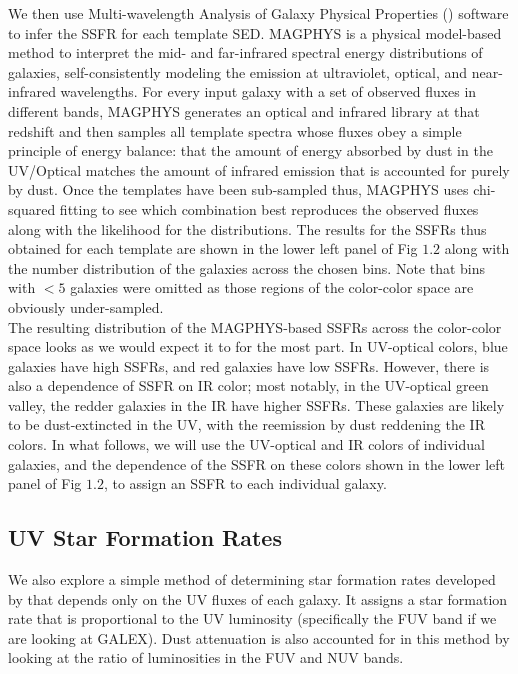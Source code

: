 We then use Multi-wavelength Analysis of Galaxy Physical Properties 
(\citet{da_cunha_simple_2008}) software to infer the SSFR for 
each template SED. MAGPHYS is a physical model-based method
to interpret the mid- and far-infrared spectral energy distributions 
of galaxies, self-consistently modeling the emission at ultraviolet, 
optical, and near-infrared wavelengths. For every input galaxy 
with a set of observed fluxes in different bands, MAGPHYS generates 
an optical and infrared library at that redshift and then 
samples all template spectra whose fluxes obey a simple principle 
of energy balance: that the amount of energy absorbed by dust 
in the UV/Optical matches the amount of infrared emission that 
is accounted for purely by dust. Once the templates have been 
sub-sampled thus, MAGPHYS uses chi-squared fitting to see which 
combination best reproduces the observed fluxes along with the 
likelihood for the distributions. The results for the SSFRs 
thus obtained for each template are shown in the lower left 
panel of Fig $1.2$ along with the number distribution of 
the galaxies across the chosen bins. Note that bins with 
$< 5$ galaxies were omitted as those regions of the 
color-color space are obviously under-sampled.\\ 

The resulting distribution of the MAGPHYS-based SSFRs 
across the color-color space looks as we would expect it 
to for the most part. In UV-optical colors, blue galaxies 
have high SSFRs, and red galaxies have low SSFRs. However, 
there is also a dependence of SSFR on IR color; most notably, 
in the UV-optical green valley, the redder galaxies in the IR 
have higher SSFRs. These galaxies are likely to be 
dust-extincted in the UV, with the reemission by dust 
reddening the IR colors. In what follows, we will use the 
UV-optical and IR colors of individual galaxies, and the 
dependence of the SSFR on these colors shown in the lower 
left panel of Fig $1.2$, to assign an SSFR to each 
individual galaxy.\\

\subsection{UV Star Formation Rates}

We also explore a simple method of determining star formation 
rates developed by \citet{salim_uv_2007-1} that depends only on 
the UV fluxes of each galaxy. It assigns a star formation rate that 
is proportional to the UV luminosity (specifically the FUV band 
if we are looking at GALEX). Dust attenuation is also accounted 
for in this method by looking at the ratio of luminosities in 
the FUV and NUV bands.\\

